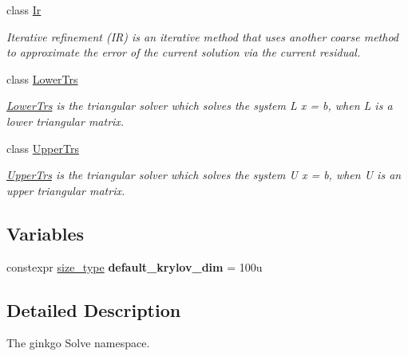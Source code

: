 \begin{DoxyCompactItemize}
class \hyperlink{classgko_1_1solver_1_1Ir}{Ir}
\begin{DoxyCompactList}\small\item\em Iterative refinement (IR) is an iterative method that uses another coarse method to approximate the error of the current solution via the current residual. \end{DoxyCompactList}\item 
class \hyperlink{classgko_1_1solver_1_1LowerTrs}{Lower\+Trs}
\begin{DoxyCompactList}\small\item\em \hyperlink{classgko_1_1solver_1_1LowerTrs}{Lower\+Trs} is the triangular solver which solves the system L x = b, when L is a lower triangular matrix. \end{DoxyCompactList}\item 
class \hyperlink{classgko_1_1solver_1_1UpperTrs}{Upper\+Trs}
\begin{DoxyCompactList}\small\item\em \hyperlink{classgko_1_1solver_1_1UpperTrs}{Upper\+Trs} is the triangular solver which solves the system U x = b, when U is an upper triangular matrix. \end{DoxyCompactList}\end{DoxyCompactItemize}
\subsection*{Variables}
\begin{DoxyCompactItemize}
\item 
\mbox{\label{namespacegko_1_1solver_a39b458ab377c785ee54f5e4cbe7ab1a6}} 
constexpr \hyperlink{namespacegko_a6e5c95df0ae4e47aab2f604a22d98ee7}{size\+\_\+type} {\bfseries default\+\_\+krylov\+\_\+dim} = 100u
\end{DoxyCompactItemize}


\subsection{Detailed Description}
The ginkgo Solve namespace. 